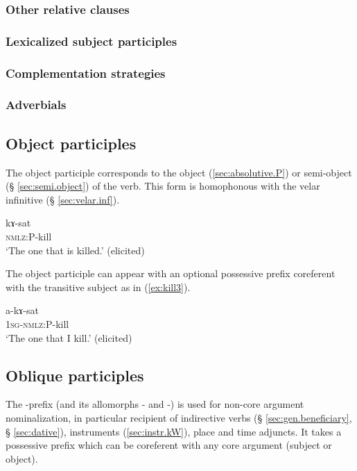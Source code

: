 \subsubsection{Other relative clauses}  \label{ex:subject.participle.other.relative}

\subsubsection{Lexicalized subject participles} \label{ex:lexicalized.subject.participle}

\subsubsection{Complementation strategies}  \label{ex:subject.participle.complementation}

\subsubsection{Adverbials} \label{ex:subject.participle.adverbial}

\subsection{Object participles}
The object participle corresponds to the object (\ref{sec:absolutive.P}) or semi-object (§ \ref{sec:semi.object}) of the verb. This form is homophonous with the velar infinitive (§ \ref{sec:velar.inf}).

 \begin{exe} 
\ex \label{ex:kill2}
\gll kɤ-sat    \\
   \textsc{nmlz}:P-kill \\
 \glt  `The one that is killed.' (elicited)
 \end{exe}
 
The object participle can appear with an optional possessive prefix coreferent with the transitive subject as in (\ref{ex:kill3}).
  
  \begin{exe}
\ex \label{ex:kill3}
\gll a-kɤ-sat    \\
   \textsc{1sg-nmlz}:P-kill \\
 \glt  `The one that I kill.' (elicited)
 \end{exe}

\subsection{Oblique participles}
The -prefix (and its allomorphs - and -) is used for non-core argument nominalization, in particular recipient of indirective verbs (§ \ref{sec:gen.beneficiary}, § \ref{sec:dative}), instruments (\ref{sec:instr.kW}), place and time adjuncts. It takes a possessive prefix which can be coreferent with any core argument (subject or object).

